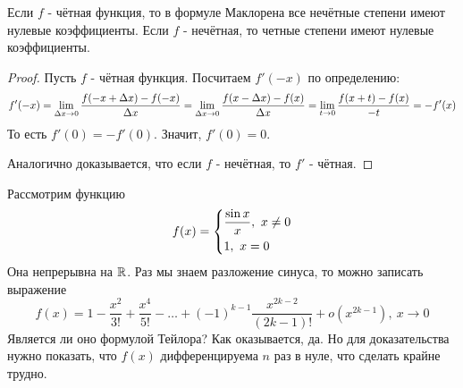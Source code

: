 \begin{note}
	Если $f$ - чётная функция, то в формуле Маклорена все нечётные степени имеют нулевые коэффициенты. Если $f$ - нечётная, то четные степени имеют нулевые коэффициенты.
\end{note}

\begin{proof}
	Пусть $f$ - чётная функция. Посчитаем $f'(-x)$ по определению:
	\[
		f'(-x) = \lim\limits_{\Delta x \to 0} \frac{f(-x + \Delta x) - f(-x)}{\Delta x} = \lim\limits_{\Delta x \to 0} \frac{f(x - \Delta x) - f(x)}{\Delta x} = \lim\limits_{t \to 0} \frac{f(x + t) - f(x)}{-t} = -f'(x)
	\]
	То есть $f'(0) = -f'(0)$. Значит, $f'(0) = 0$.
	
	Аналогично доказывается, что если $f$ - нечётная, то $f'$ - чётная.
\end{proof}

\begin{addition}
	Рассмотрим функцию
	\[
		f(x) = \left\{\begin{aligned}
		&{\frac{\sin x}{x},\ x \neq 0}
		\\
		&{1,\ x = 0}
		\end{aligned}\right.
	\]
	Она непрерывна на $\mathbb{R}$. Раз мы знаем разложение синуса, то можно записать выражение
	\[
		f(x) = 1 - \frac{x^2}{3!} + \frac{x^4}{5!} - \ldots + (-1)^{k - 1} \frac{x^{2k - 2}}{(2k - 1)!} + o(x^{2k - 1}),\ x \to 0
	\]
	Является ли оно формулой Тейлора? Как оказывается, да. Но для доказательства нужно показать, что $f(x)$ дифференцируема $n$ раз в нуле, что сделать крайне трудно.
\end{addition}